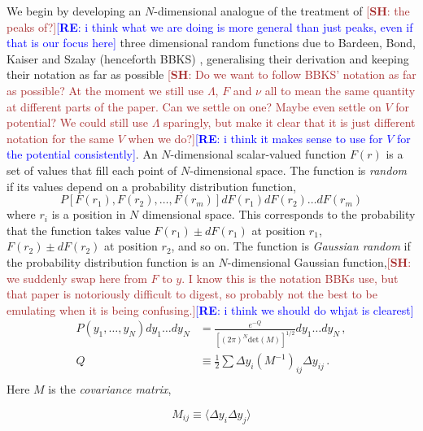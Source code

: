 \documentclass[12pt]{article}
\newcommand{\re}[1]{\textcolor{blue}{[{\bf RE}: #1]}}
\newcommand{\SH}[1]{\textcolor{brown}{[{\bf SH}: #1]}}
\begin{document}
We begin by developing an $N$-dimensional analogue of the treatment of \SH{the peaks of?}\re{i think what we are doing is more general than just peaks, even if that is our focus here}  three dimensional random functions due to Bardeen, Bond, Kaiser and Szalay (henceforth BBKS) \cite{BBKS}, generalising their derivation and keeping their notation as far as possible \SH{Do we want to follow BBKS' notation as far as possible? At the moment we still use $\Lambda$, $F$ and $\nu$ all to mean the same quantity at different parts of the paper. Can we settle on one? Maybe even settle on $V$ for potential? We could still use $\Lambda$ sparingly, but make it clear that it is just different notation for the same $V$ when we do?}\re{i think it makes sense to use for $V$ for the potential consistently}.   An $N$-dimensional scalar-valued function $F(r)$ is a set of values that fill each point of $N$-dimensional space. The function is \emph{random} if its values depend on a probability distribution function,
%
\begin{equation}
P[F(r_1), F(r_2), \ldots, F(r_m)]dF(r_1)dF(r_2)\ldots dF(r_m)
\end{equation}
%
\noindent where $r_i$ is a position in $N$ dimensional space. This corresponds to the probability that the function takes value $F(r_1) \pm dF(r_1)$ at position $r_1$, $F(r_2) \pm dF(r_2)$ at position $r_2$, and so on. 
%
The function is \emph{Gaussian random} if the probability distribution function is an $N$-dimensional Gaussian function,\SH{we suddenly swap here from $F$ to $y$. I know this is the notation BBKs use, but that paper is notoriously difficult to digest, so probably not the best to be emulating when it is being confusing.}\re{i think we should do whjat is clearest}
%
\begin{equation} \label{MultivariateGaussian}
\begin{split}
P(y_1,\ldots,y_N)dy_1\ldots dy_N &= \frac{e^{-Q}}{[(2\pi)^N \mathrm{det}(M)]^{1/2}} dy_1\ldots dy_N \, ,\\
Q &\equiv \frac{1}{2} \sum \Delta y_i (M^{-1})_{ij} \Delta y_{ij} \, .\\
\end{split}
\end{equation}
%
Here $M$ is the \emph{covariance matrix}, 

\begin{equation}
M_{ij} \equiv \langle \Delta y_i \Delta y_j \rangle
\end{equation}
\end{document}
